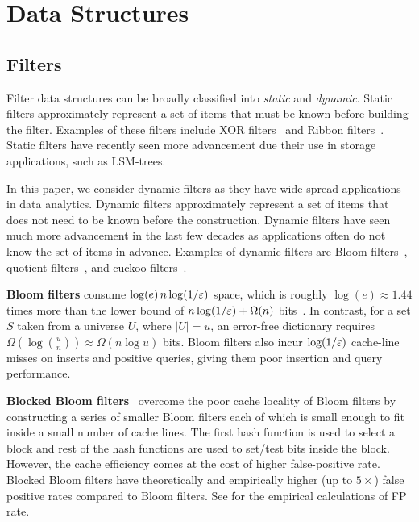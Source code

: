 
\section{Data Structures}

\subsection{Filters}\label{sec:prelim}

Filter data structures can be broadly classified into \emph{static} and
\emph{dynamic}.  Static filters approximately represent a set of items that must
be known before building the filter. Examples of these filters include XOR
filters~\cite{GrafLe20} and Ribbon filters~\cite{DillingerWalzer21}. Static
filters have recently seen more advancement due their use in storage
applications, such as LSM-trees.


In this paper, we consider dynamic filters as they have wide-spread applications
in data analytics.  Dynamic filters approximately represent a set of items that
does not need to be known before the construction. Dynamic filters have seen
much more advancement in the last few decades as applications often do not know
the set of items in advance. Examples of dynamic filters are Bloom
filters~\cite{Bloom70}, quotient filters~\cite{BenderFaJo12,
PandeyBJP17b,DillingerMa09,PaghPaRa05,EinzigerFr16}, and cuckoo
filters~\cite{FanAnKa14,BreslowJ18}.

\textbf{Bloom filters} consume $\log(e)\, n\log (1/\varepsilon)$ space, which is roughly
$\log(e)\approx 1.44$ times more than the lower bound of $n\log (1/\varepsilon) + \Omega(n)$
bits~\cite{CarterFG78}. In contrast, for a set $S$ taken from a universe $U$,
where $|U|=u$, an error-free dictionary requires $\Omega(\log {u\choose n})
\approx \Omega(n \log u)$ bits. Bloom filters also incur $\log (1/\varepsilon)$ cache-line
misses on inserts and positive queries, giving them poor insertion and query
performance.

\textbf{Blocked Bloom filters}~\cite{putze2007cache} overcome the poor cache
locality of Bloom filters by constructing a series of smaller Bloom filters each
of which is small enough to fit inside a small number of cache lines. The first
hash function is used to select a block and rest of the hash functions are used
to set/test bits inside the block. However, the cache efficiency comes at the
cost of higher false-positive rate. Blocked Bloom filters have theoretically and
empirically higher (up to $5\times$) false positive rates compared to Bloom
filters. See  for the empirical calculations of FP
rate.

